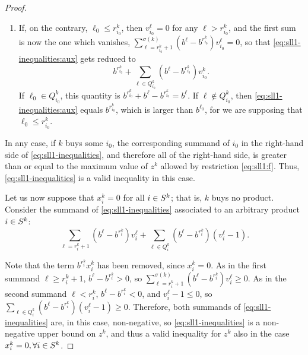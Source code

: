 \begin{proof}
\begin{enumerate}
        \item %
	    If, on the contrary, $\ell_0 \leq r_{i_0}^k$, then $v_{i_0}^\ell =
	    0$ for any $\ell > r_{i_0}^k$, and the first sum is now the one
	    which vanishes,
            $
                \sum_{\ell = r_{i_0}^k + 1}^{\sigma(k)}
                    \left(b^\ell - b^{r_{i_0}^k}\right)v_{i_0}^\ell
                = 0
            $,
            so that \eqref{eq:sll1-inequalities:aux} gets reduced to
            \[
                b^{r_{i_0}^k}
                    + \sum_{\ell \in Q_{i_0}^k}
                        (b^\ell - b^{r_{i_0}^k}) v_{i_0}^k.
            \]
            If $\ell_0 \in Q_{i_0}^k$, this quantity is
            $
                b^{r_{i_0}^k} + b^\ell - b^{r_{i_0}^k} = b^\ell
            $.
	    If $\ell \not\in Q_{i_0}^k$, then \eqref{eq:sll1-inequalities:aux}
	    equals $b^{r_{i_0}^k}$, which is larger than $b^{\ell_0}$, for we
	    are supposing that $\ell_0 \leq r_{i_0}^k$.
        
    \end{enumerate}

    In any case, if $k$ buys some $i_0$, the corresponding summand of $i_0$ in
    the right-hand side of \eqref{eq:sll1-inequalities}, and therefore all of the
    right-hand side, is greater than or equal to the maximum value of $z^k$
    allowed by restriction \eqref{eq:sll1:f}. Thus, \eqref{eq:sll1-inequalities} is
    a valid inequality in this case.

    Let us now suppose that $x_i^k = 0$ for all ${i \in S^k}$; that is, $k$ buys no
    product. Consider the summand of \eqref{eq:sll1-inequalities} associated to an
    arbitrary product ${i \in S^k}$:
    \[
        \sum_{\ell = r_i^k + 1} \left(b^\ell - b^{r_i^k}\right)v_i^\ell
            + \sum_{\ell \in Q_i^k} \left(b^\ell - b^{r_i^k}\right)\left(v_i^\ell - 1\right).
    \]

    Note that the term $b^{r_i^k}x_i^k$ has been removed, since $x_i^k = 0$. As
    in the first summand $\ell \geq r_i^k + 1$, $b^\ell - b^{r_i^k} > 0$, so
    $
        \sum_{\ell = r_i^k + 1}^{\sigma\left(k\right)}
            \left(b^\ell - b^{r_i^k}\right)v_i^\ell \geq 0
    $.
    As in the second summand $\ell < r_i^k$, $b^\ell - b^{r_i^k} < 0$, and
    $v_i^\ell - 1 \leq 0$, so
    $
        \sum_{\ell \in Q_i^k} \left(b^\ell - b^{r_i^k}\right)\left(v_i^\ell - 1\right) \geq 0
    $.
    Therefore, both summands of \eqref{eq:sll1-inequalities} are, in this case,
    non-negative, so \eqref{eq:sll1-inequalities} is a non-negative upper bound
    on $z^k$, and thus a valid inequality for $z^k$ also in the case $x_i^k = 0,
    \forall{\ensuremath{i \in S^k}}$.
\end{proof}

